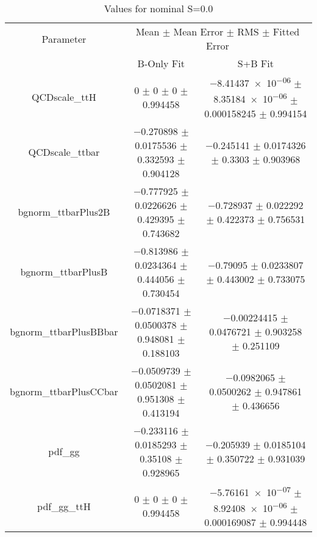 \begin{table}
\centering
\caption{Values for nominal S=0.0}
\begin{tabular}{ccc}
\toprule
Parameter & \multicolumn{2}{c}{Mean $\pm$ Mean Error $\pm$ RMS $\pm$ Fitted Error}\\
 & B-Only Fit & S+B Fit\\
\midrule
QCDscale\_ttH & \num{0} $\pm$ \num{0} $\pm$ \num{0} $\pm$ \num{0.994458} & \num{-8.41437e-06} $\pm$ \num{8.35184e-06} $\pm$ \num{0.000158245} $\pm$ \num{0.994154}\\
QCDscale\_ttbar & \num{-0.270898} $\pm$ \num{0.0175536} $\pm$ \num{0.332593} $\pm$ \num{0.904128} & \num{-0.245141} $\pm$ \num{0.0174326} $\pm$ \num{0.3303} $\pm$ \num{0.903968}\\
bgnorm\_ttbarPlus2B & \num{-0.777925} $\pm$ \num{0.0226626} $\pm$ \num{0.429395} $\pm$ \num{0.743682} & \num{-0.728937} $\pm$ \num{0.022292} $\pm$ \num{0.422373} $\pm$ \num{0.756531}\\
bgnorm\_ttbarPlusB & \num{-0.813986} $\pm$ \num{0.0234364} $\pm$ \num{0.444056} $\pm$ \num{0.730454} & \num{-0.79095} $\pm$ \num{0.0233807} $\pm$ \num{0.443002} $\pm$ \num{0.733075}\\
bgnorm\_ttbarPlusBBbar & \num{-0.0718371} $\pm$ \num{0.0500378} $\pm$ \num{0.948081} $\pm$ \num{0.188103} & \num{-0.00224415} $\pm$ \num{0.0476721} $\pm$ \num{0.903258} $\pm$ \num{0.251109}\\
bgnorm\_ttbarPlusCCbar & \num{-0.0509739} $\pm$ \num{0.0502081} $\pm$ \num{0.951308} $\pm$ \num{0.413194} & \num{-0.0982065} $\pm$ \num{0.0500262} $\pm$ \num{0.947861} $\pm$ \num{0.436656}\\
pdf\_gg & \num{-0.233116} $\pm$ \num{0.0185293} $\pm$ \num{0.35108} $\pm$ \num{0.928965} & \num{-0.205939} $\pm$ \num{0.0185104} $\pm$ \num{0.350722} $\pm$ \num{0.931039}\\
pdf\_gg\_ttH & \num{0} $\pm$ \num{0} $\pm$ \num{0} $\pm$ \num{0.994458} & \num{-5.76161e-07} $\pm$ \num{8.92408e-06} $\pm$ \num{0.000169087} $\pm$ \num{0.994448}\\
\bottomrule
\end{tabular}
\end{table}